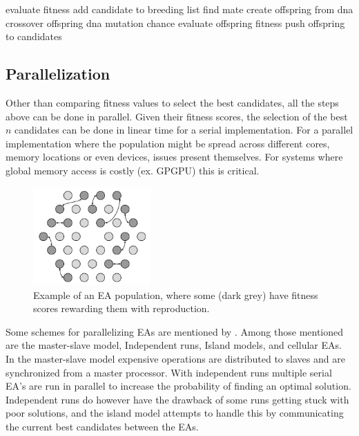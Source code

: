 \documentclass[twocolumn]{article} %
\begin{document}
		\begin{algorithmic}
				\State evaluate fitness
			\EndFor
						\State add candidate to breeding list
					\EndIf
				\EndFor
					\State find mate
					\State create offspring from dna crossover
					\State offspring dna mutation chance
					\State evaluate offspring fitness
					\State push offspring to candidates
				\EndFor
			\EndWhile
		\end{algorithmic}
	
	\subsection*{Parallelization}
		Other than comparing fitness values to select the best candidates, all the steps above can be done in parallel. Given
		their fitness scores, the selection of the best $n$ candidates can be done in linear time for a serial implementation.
		For a parallel implementation where the population might be spread across different cores, memory locations or even
		devices, issues present themselves. For systems where global memory access is costly (ex. GPGPU)	this is critical.
		
		\begin{figure}[h]
			\centering
			\includegraphics[width=0.4\textwidth]{ea}
			\caption{Example of an EA population, where some (dark grey) have fitness scores rewarding them with reproduction.}
			\label{fig:ea}
		\end{figure}
		
		Some schemes for parallelizing EAs are mentioned by \cite{sudholt15}. Among those mentioned are the master-slave model,
		Independent runs, Island models, and cellular EAs. In the master-slave model expensive operations are distributed to
		slaves and are synchronized from a master processor. With independent runs multiple serial EA's are run in parallel to
		increase the probability of finding an optimal solution. Independent runs do however have the drawback of some runs
		getting stuck with poor solutions, and the island model attempts to handle this by communicating the current best
		candidates between the EAs.
		
\end{document}

